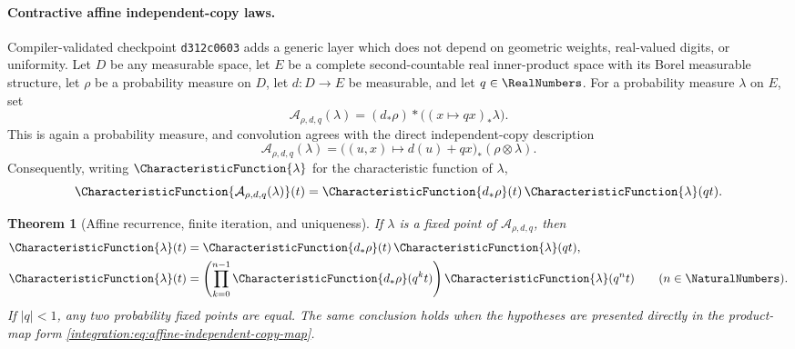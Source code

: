 \documentclass[11pt,oneside]{article}
\newtheorem{theorem}{Theorem}[section]
\theoremstyle{definition}
\theoremstyle{remark}
\begin{document}
\paragraph{Contractive affine independent-copy laws.}
Compiler-validated checkpoint \texttt{d312c0603} adds a generic layer which does not depend
on geometric weights, real-valued digits, or uniformity.  Let \(D\) be any measurable
space, let \(E\) be a complete second-countable real inner-product space with its Borel
measurable structure, let \(\rho\) be a probability measure on \(D\), let \(d:D\to E\) be
measurable, and let \(q\in\RealNumbers\).  For a probability measure \(\lambda\) on \(E\), set
\begin{equation}
 \mathcal A_{\rho,d,q}(\lambda)
  =(d_*\rho)*\bigl((x\mapsto qx)_*\lambda\bigr).
 \label{integration:eq:affine-independent-copy-law}
\end{equation}
This is again a probability measure, and convolution agrees with the direct independent-copy
description
\begin{equation}
 \mathcal A_{\rho,d,q}(\lambda)
 =\bigl((u,x)\mapsto d(u)+qx\bigr)_*(\rho\otimes\lambda).
 \label{integration:eq:affine-independent-copy-map}
\end{equation}
Consequently, writing \(\CharacteristicFunction{\lambda}\) for the characteristic
function of \(\lambda\),
\begin{equation}
 \CharacteristicFunction{\mathcal A_{\rho,d,q}(\lambda)}(t)
 =\CharacteristicFunction{d_*\rho}(t)\,\CharacteristicFunction{\lambda}(qt).
 \label{integration:eq:affine-independent-copy-charfun}
\end{equation}

\begin{theorem}[Affine recurrence, finite iteration, and uniqueness]
\label{integration:thm:affine-independent-copy-unique}
If \(\lambda\) is a fixed point of \(\mathcal A_{\rho,d,q}\), then
\begin{align}
 \CharacteristicFunction{\lambda}(t)
   &=\CharacteristicFunction{d_*\rho}(t)\,\CharacteristicFunction{\lambda}(qt),
      \label{integration:eq:affine-charfun-recurrence}\\
 \CharacteristicFunction{\lambda}(t)
   &=\left(\prod_{k=0}^{n-1}\CharacteristicFunction{d_*\rho}(q^kt)\right)
      \CharacteristicFunction{\lambda}(q^nt) \qquad(n\in\NaturalNumbers).
      \label{integration:eq:affine-charfun-iterate}
\end{align}
If \(|q|<1\), any two probability fixed points are equal.  The same conclusion holds when
the hypotheses are presented directly in the product-map form
\eqref{integration:eq:affine-independent-copy-map}.
\end{theorem}
\end{document}
